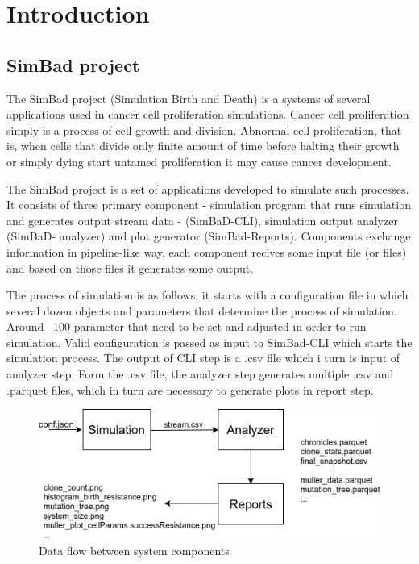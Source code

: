 \chapter{Introduction}
\section{SimBad project}
The SimBad project (Simulation Birth and Death) is a systems of several applications used in cancer cell proliferation simulations. Cancer cell proliferation simply is a  process of cell growth and division. Abnormal cell proliferation, that is, when  cells that divide only finite amount of time before halting their growth or simply dying start untamed proliferation it may cause cancer development.

The SimBad project is a set of applications developed to simulate such processes. It consists of three primary component - simulation program that runs simulation and generates output stream data - (SimBaD-CLI), simulation output analyzer (SimBaD- analyzer) and plot generator (SimBad-Reports). Components exchange information in pipeline-like way, each component recives some input file (or files) and based on those files it generates some output.

The process of simulation is as follows: it starts with a configuration file in which several dozen objects and parameters that determine the process of simulation. Around ~100 parameter that need to be set and adjusted in order to run simulation. Valid configuration is passed as input to SimBad-CLI which starts the simulation process. The output of CLI step is a .csv file which i turn is input of analyzer step. Form the .csv file, the analyzer step generates multiple .csv and .parquet files, which in turn are necessary to generate plots
in report step.

\begin{figure}[h!]
	\centering
		\includegraphics[width=0.9\linewidth]{diagrams/simbad-data-flow.png}
	\caption{Data flow between system components}
	\label{fig:data-flow}
\end{figure}

